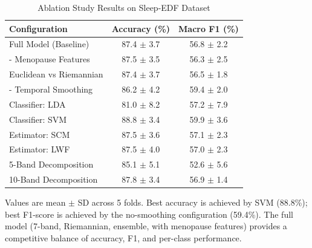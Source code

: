 \documentclass[a4paper,fleqn]{cas-dc}
\begin{document}
\begin{table}[!ht]
\centering
\caption{Ablation Study Results on Sleep-EDF Dataset}
\label{tab:ablation}
\begin{threeparttable}
\begin{tabular}{lcc}
\toprule
\textbf{Configuration} & \textbf{Accuracy (\%)} & \textbf{Macro F1 (\%)} \\
\midrule
Full Model (Baseline) & 87.4 $\pm$ 3.7 & 56.8 $\pm$ 2.2 \\
- Menopause Features & 87.5 $\pm$ 3.5 & 56.3 $\pm$ 2.5 \\
Euclidean vs Riemannian & 87.4 $\pm$ 3.7 & 56.5 $\pm$ 1.8 \\
- Temporal Smoothing & 86.2 $\pm$ 4.2 & 59.4 $\pm$ 2.0 \\
Classifier: LDA & 81.0 $\pm$ 8.2 & 57.2 $\pm$ 7.9 \\
Classifier: SVM & 88.8 $\pm$ 3.4 & 59.9 $\pm$ 3.6 \\
Estimator: SCM & 87.5 $\pm$ 3.6 & 57.1 $\pm$ 2.3 \\
Estimator: LWF & 87.5 $\pm$ 4.0 & 57.0 $\pm$ 2.3 \\
5-Band Decomposition & 85.1 $\pm$ 5.1 & 52.6 $\pm$ 5.6 \\
10-Band Decomposition & 87.8 $\pm$ 3.4 & 56.9 $\pm$ 1.4 \\
\bottomrule
\end{tabular}
\begin{tablenotes}
\small
\item Values are mean $\pm$ SD across 5 folds. Best accuracy is achieved by SVM (88.8\%); best F1-score is achieved by the no-smoothing configuration (59.4\%). The full model (7-band, Riemannian, ensemble, with menopause features) provides a competitive balance of accuracy, F1, and per-class performance.
\end{tablenotes}
\end{threeparttable}
\end{table}
\end{document}
